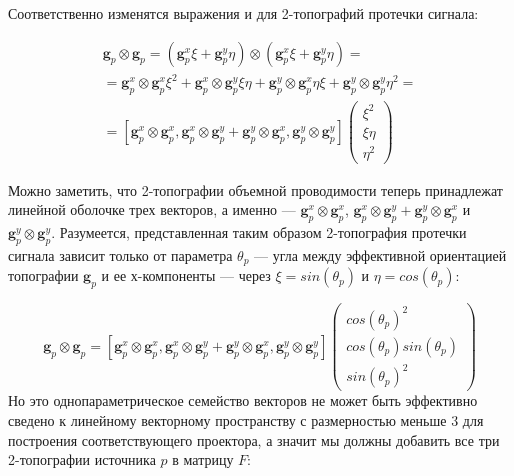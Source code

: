 Соответственно изменятся выражения и для 2-топографий протечки сигнала:

\begin{gather}
    \mathbf{g}_p \otimes \mathbf{g}_p = (\mathbf{g}_p^x \xi
                                      + \mathbf{g}_p^y \eta) \otimes (\mathbf{g}_p^x \xi
                                      + \mathbf{g}_p^y \eta) = \nonumber \\
                                      = \mathbf{g}_p^x \otimes \mathbf{g}_p^x \xi^2
                                      + \mathbf{g}_p^x \otimes \mathbf{g}_p^y \xi \eta
                                      + \mathbf{g}_p^y\otimes  \mathbf{g}_p^x \eta \xi
                                      + \mathbf{g}_p^y \otimes \mathbf{g}_p^y \eta^2 = \nonumber \\
                                      = [\mathbf{g}_p^x \otimes \mathbf{g}_p^x,
                                         \mathbf{g}_p^x \otimes \mathbf{g}_p^y
                                      + \mathbf{g}_p^y \otimes \mathbf{g}_p^x,
                                        \mathbf{g}_p^y \otimes \mathbf{g}_p^y]
\left( \begin{array}{ccc}
\xi^2 \\
\xi \eta \\
\eta^2
\end{array}
\right)
\label{eq:orient_dip_comps}
\end{gather}

Можно заметить, что 2-топографии объемной проводимости теперь принадлежат линейной оболочке трех векторов,
а именно --- $\mathbf{g}_p^x \otimes \mathbf{g}_p^x$, $\mathbf{g}_p^x \otimes \mathbf{g}_p^y + \mathbf{g}_p^y \otimes \mathbf{g}_p^x$ и $\mathbf{g}_p^y \otimes \mathbf{g}_p^y$.
Разумеется, представленная таким образом 2-топография протечки сигнала зависит только от параметра $\theta_p$ --- угла
между эффективной ориентацией топографии $\mathbf{g}_p$ и ее $х$-компоненты --- через $\xi = sin(\theta_p)$ и $\eta=cos(\theta_p)$:

\begin{equation*}
    \mathbf{g}_p \otimes \mathbf{g}_p =
    [\mathbf{g}_p^x \otimes \mathbf{g}_p^x, \mathbf{g}_p^x \otimes \mathbf{g}_p^y +
     \mathbf{g}_p^y \otimes \mathbf{g}_p^x, \mathbf{g}_p^y \otimes \mathbf{g}_p^y]
    \left( \begin{array}{ccc}
    cos(\theta_p)^2 \\
    cos(\theta_p) sin(\theta_p) \\
    sin(\theta_p)^2
    \end{array}
    \right)
\end{equation*}
Но это однопараметрическое семейство векторов не может быть эффективно сведено к линейному векторному
пространству с размерностью меньше 3 для построения соответствующего проектора,
а значит мы должны добавить все три 2-топографии источника $p$ в матрицу $F$:

